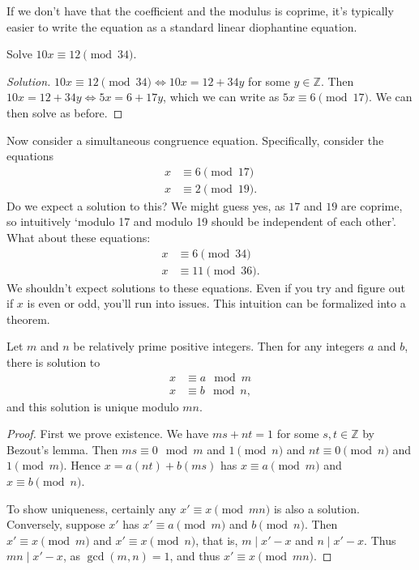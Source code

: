 \documentclass[a4paper]{scrartcl}
\begin{document}
If we don't have that the coefficient and the modulus is coprime, it's typically easier to write the equation as a standard linear diophantine equation.

\begin{example}
	Solve $10x \equiv 12 \pmod{34}$.
\end{example}
\begin{proof}[Solution]
	$10x \equiv 12 \pmod{34} \iff 10x = 12 + 34 y$ for some $y \in \mathbb{Z}$. Then $10x = 12 + 34y \iff 5x = 6 + 17 y$, which we can write as $5x \equiv 6 \pmod{17}$. We can then solve as before. 
\end{proof}

Now consider a simultaneous congruence equation. Specifically, consider the equations
\begin{align*}
	x &\equiv 6 \pmod{17} \\
	x &\equiv 2 \pmod{19}.
\end{align*}
Do we expect a solution to this? We might guess yes, as $17$ and $19$ are coprime, so intuitively `modulo 17 and modulo 19 should be independent of each other'. What about these equations:
\begin{align*}
	x &\equiv 6 \pmod{34} \\
	x &\equiv 11 \pmod{36}.
\end{align*}
We shouldn't expect solutions to these equations. Even if you try and figure out if $x$ is even or odd, you'll run into issues. This intuition can be formalized into a theorem.

\begin{theorem}
	Let $m$ and $n$ be relatively prime positive integers. Then for any integers $a$ and $b$, there is solution to
	\begin{align*}
		x &\equiv a \mod{m} \\
		x &\equiv b \mod{n},
	\end{align*}
	and this solution is unique modulo $mn$. 
\end{theorem}
\begin{proof}
	First we prove existence. We have $ms + nt = 1$ for some $s, t \in \mathbb{Z}$ by Bezout's lemma. Then $ms \equiv 0 \mod{m}$ and $1 \pmod{n}$ and $nt \equiv 0 \pmod{n}$ and $1 \pmod{m}$. Hence
	$x = a(nt) + b(ms)$ has $x \equiv a \pmod{m}$ and $x \equiv b \pmod{n}$.

	To show uniqueness, certainly any $x' \equiv x \pmod{mn}$ is also a solution. Conversely, suppose $x'$ has $x' \equiv a \pmod{m}$ and $b \pmod{n}$. Then $x' \equiv x \pmod{m}$ and $x' \equiv x \pmod{n}$, that is, $m \mid x' - x$ and $n \mid x' - x$. Thus $mn \mid x' - x$, as $\gcd(m, n) = 1$, and thus $x' \equiv x \pmod{mn}$.
\end{proof}
\end{document}
